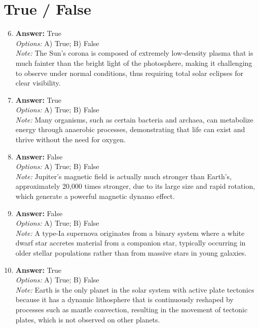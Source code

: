 \documentclass[12pt]{article}
\begin{document}
\section*{True / False}
\begin{enumerate}[label=\arabic*.]
\setcounter{enumi}{5}
\item \textbf{Answer:} True
\\ \textit{Options:} A) True; B) False
\\ \textit{Note:} The Sun's corona is composed of extremely low-density plasma that is much fainter than the bright light of the photosphere, making it challenging to observe under normal conditions, thus requiring total solar eclipses for clear visibility.
\item \textbf{Answer:} True
\\ \textit{Options:} A) True; B) False
\\ \textit{Note:} Many organisms, such as certain bacteria and archaea, can metabolize energy through anaerobic processes, demonstrating that life can exist and thrive without the need for oxygen.
\item \textbf{Answer:} False
\\ \textit{Options:} A) True; B) False
\\ \textit{Note:} Jupiter's magnetic field is actually much stronger than Earth's, approximately 20,000 times stronger, due to its large size and rapid rotation, which generate a powerful magnetic dynamo effect.
\item \textbf{Answer:} False
\\ \textit{Options:} A) True; B) False
\\ \textit{Note:} A type-Ia supernova originates from a binary system where a white dwarf star accretes material from a companion star, typically occurring in older stellar populations rather than from massive stars in young galaxies.
\item \textbf{Answer:} True
\\ \textit{Options:} A) True; B) False
\\ \textit{Note:} Earth is the only planet in the solar system with active plate tectonics because it has a dynamic lithosphere that is continuously reshaped by processes such as mantle convection, resulting in the movement of tectonic plates, which is not observed on other planets.
\end{enumerate}
\end{document}
